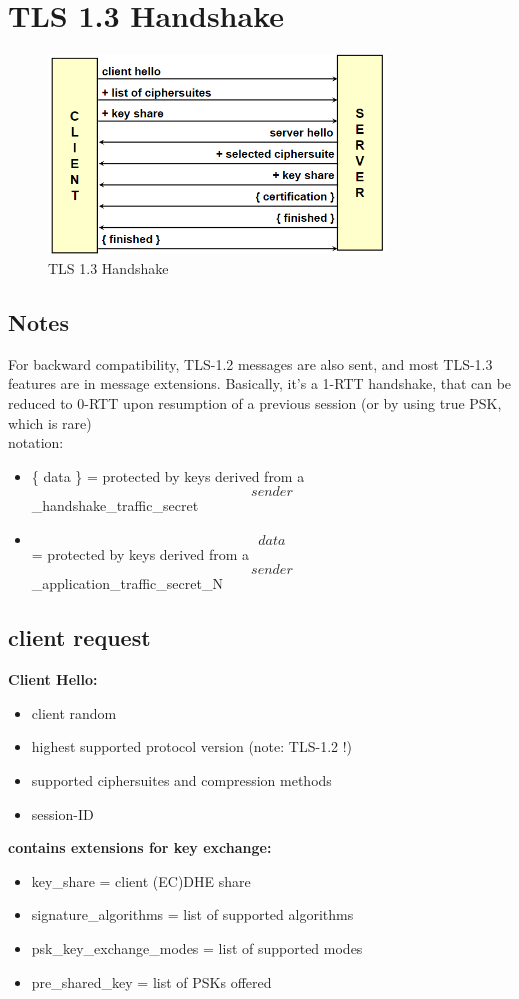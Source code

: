 \section{TLS 1.3 Handshake}
\begin{figure}[ht]
    \centering
    \includegraphics[width=0.8\textwidth]{img/handshakeTLS13.png}
    \caption{TLS 1.3 Handshake}
    \label{fig:tls_handshake}
\end{figure}

\subsection{Notes}
For backward compatibility, TLS-1.2 messages are also sent, and most TLS-1.3 features are in message extensions.
Basically, it's a 1-RTT handshake, that can be reduced to 0-RTT upon resumption of a previous session (or by using true PSK, which is rare)
\\
notation:
\begin{itemize}

    \item\{ data \} = protected by keys derived from a \[sender\]\_handshake\_traffic\_secret
    \item \[ data \] = protected by keys derived from a \[sender\]\_application\_traffic\_secret\_N
\end{itemize}

\subsection{client request}
\textbf{Client Hello:}
\begin{itemize}
    \item client random
    \item highest supported protocol version (note: TLS-1.2 !)
    \item supported ciphersuites and compression methods
    \item session-ID
\end{itemize}
\textbf{contains extensions for key exchange:}
\begin{itemize}
    \item key\_share = client (EC)DHE share
    \item signature\_algorithms = list of supported algorithms
    \item psk\_key\_exchange\_modes = list of supported modes
    \item pre\_shared\_key = list of PSKs offered
\end{itemize}

